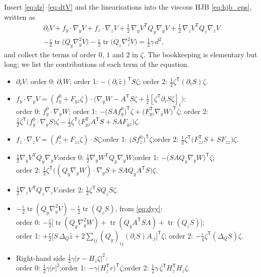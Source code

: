 \documentclass[11pt,a4paper]{article}
\newcommand{\tr}{\operatorname{tr}}
\newcommand{\T}{^{\mathsf T}}
\newcommand{\zh}{\hat{z}}
\newcommand{\eps}{\varepsilon}
\newcommand{\abs}[1]{\left\lvert #1 \right\rvert}
\newcommand{\gy}{\nabla_{\!y}}
\newcommand{\gz}{\nabla_{\!z}}
\newcommand{\Hy}{\nabla_{\!y}^2}
\theoremstyle{plain}
\theoremstyle{definition}
\theoremstyle{remark}
\begin{document}
Insert \eqref{eq:dz}--\eqref{eq:dtV} and the linearisations into the viscous HJB \eqref{eq:hjb_eps}, written as
\begin{multline*}
  \partial_t V + f_y\cdot\gy V + f_z\cdot\gz V + \tfrac12\,\gy V\T Q_y\gy V + \tfrac12\,\gz V\T Q_z\gz V \\
  - \tfrac{\eps}{2}\tr\big(Q_y\Hy V\big) - \tfrac{\eps}{2}\tr\big(Q_z\gz^2 V\big) = \tfrac12\gamma\, d^2 ,
\end{multline*}
and collect the terms of order $0$, $1$ and $2$ in $\zeta$. The bookkeeping is elementary but long; we list the contributions of each term of the equation.
\begin{itemize}[leftmargin=1.5em]
  \item $\partial_t V$: order 0: $\partial_tW$; order 1: $-(\partial_t\zh)\T S\zeta$; order 2: $\tfrac12\zeta\T(\partial_tS)\zeta$.
  \item $f_y\cdot\gy V = (f_y^0+F_{yz}\zeta)\cdot\big(\gy W - A\T S\zeta + \tfrac12[\zeta\T\partial_iS\zeta]_i\big)$:\\
    order 0: $f_y^0\cdot\gy W$;\quad
    order 1: $-\big(SAf_y^0\big)\T\zeta + \big(F_{yz}\T\gy W\big)\T\zeta$;\quad
    order 2: $\tfrac12\zeta\T\big(f_y^0\cdot\gy S\big)\zeta - \tfrac12\zeta\T\big(F_{yz}\T A\T S + SAF_{yz}\big)\zeta$.
  \item $f_z\cdot\gz V = (f_z^0+F_{zz}\zeta)\cdot S\zeta$:\quad order 1: $\big(Sf_z^0\big)\T\zeta$;\quad order 2: $\tfrac12\zeta\T\big(F_{zz}\T S+SF_{zz}\big)\zeta$.
  \item $\tfrac12\gy V\T Q_y\gy V$:\quad order 0: $\tfrac12\gy W\T Q_y\gy W$;\quad order 1: $-\big(SAQ_y\gy W\big)\T\zeta$;\\
    order 2: $\tfrac12\zeta\T\big((Q_y\gy W)\cdot\gy S + SAQ_yA\T S\big)\zeta$.
  \item $\tfrac12\gz V\T Q_z\gz V$:\quad order 2: $\tfrac12\zeta\T SQ_zS\zeta$.
  \item $-\tfrac{\eps}{2}\tr(Q_y\Hy V) - \tfrac{\eps}{2}\tr(Q_z S)$, from \eqref{eq:dyy}:\\
    order 0: $-\tfrac{\eps}{2}\big[\tr(Q_y\Hy W) + \tr(Q_yA\T SA) + \tr(Q_zS)\big]$;\\
    order 1: $+\tfrac{\eps}{2}\big[S\,\Delta_Q\zh + 2\sum_{ij}(Q_y)_{ij}(\partial_iS)A_{\cdot j}\big]\T\zeta$;\quad
    order 2: $-\tfrac{\eps}{4}\zeta\T(\Delta_QS)\zeta$.
  \item Right-hand side $\tfrac12\gamma\abs{r-H_z\zeta}^2$:\\
    order 0: $\tfrac12\gamma\abs r^2$;\quad order 1: $-\gamma\big(H_z\T r\big)\T\zeta$;\quad order 2: $\tfrac12\gamma\,\zeta\T H_z\T H_z\zeta$.
\end{itemize}
\end{document}
